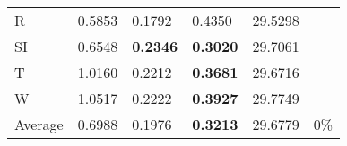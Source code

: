 \documentclass[11pt, a4paper]{article}
\begin{document}
\begin{table}[H]
\begin{tabular}{llllll}
R                                & 0.5853                            & 0.1792                            & 0.4350                               & 29.5298                                     &                                   \\
SI                        & 0.6548                            & \textbf{0.2346}                   & \textbf{0.3020}                      & 29.7061                                     &                                   \\
T                              & 1.0160                            & 0.2212                            & \textbf{0.3681}                      & 29.6716                                     &                                   \\
W                             & 1.0517                            & 0.2222                            & \textbf{0.3927}                      & 29.7749                                     &                                   \\ \hline
Average                               & 0.6988                            & 0.1976                            & \textbf{0.3213}                      & 29.6779                                     & 0\%
\end{tabular}
\end{table}
\end{document}
